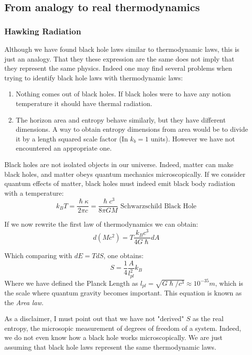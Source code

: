 \documentclass[12pt]{article}
\begin{document}
\subsection{From analogy to real thermodynamics}
\subsubsection{Hawking Radiation}

Although we have found black hole laws similar to thermodynamic laws, this is just an analogy. That they these expression are the same does not imply that they represent the same physics. Indeed one may find several problems when trying to identify black hole laws with thermodynamic laws:

\begin{enumerate}
    \item Nothing comes out of black holes. If black holes were to have any notion temperature it should have thermal radiation.
    \item The horizon area and entropy behave similarly, but they have different dimensions. A way to obtain entropy dimensions from area would be to divide it by a length squared scale factor (In $k_b =1$ units). However we have not encountered an appropriate one.
\end{enumerate}

Black holes are not isolated objects in our universe. Indeed, matter can make black holes, and matter obeys quantum mechanics microscopically. If we consider quantum effects of matter, black holes must indeed emit black body radiation with a temperature:
\[
    k_BT = \frac{\hslash\kappa}{2\pi c} = \frac{\hslash c^3}{8\pi GM}\text{      Schwarzschild Black Hole}
\]

If we now rewrite the first law of thermodynamics we can obtain:
\[
    d(Mc^2) = T\frac{k_Bc^3}{4G\hslash}dA
\]

Which comparing with $dE = TdS$, one obtains:
\[
    S = \frac{1}{4}\frac{A}{l_{pl}^2}k_B
\]
Where we have defined the Planck Length as $l_{pl} = \sqrt{G\hslash/c^3}\approx 10^{-35}m$, which is the scale where quantum gravity becomes important. This equation is known as the \textit{Area law}.

\vspace{.25cm}

As a disclaimer, I must point out that we have not "derived" $S$ as the real entropy, the microsopic measurement of degrees of freedom of a system. Indeed, we do not even know how a black hole works microscopically. We are just assuming that black hole laws represent the same thermodynamic laws.
\end{document}
